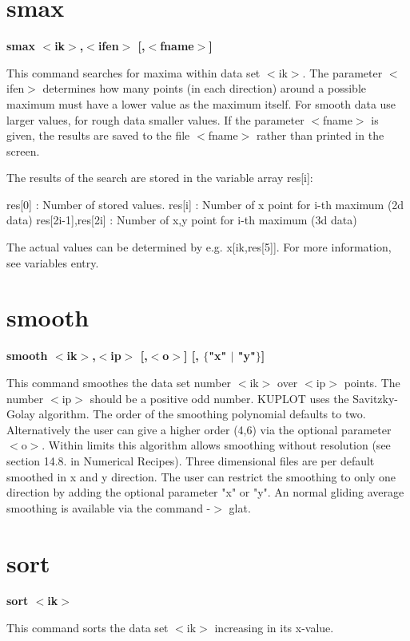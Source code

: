 \section{smax}
{\bf smax $ <$ik$> $,$ <$ifen$> $ [,$ <$fname$> $] \par }
\par
\vspace{3pt}
This command searches for maxima within data set $ <$ik$> $. 
The parameter $ <$ifen$> $ determines how many points (in each 
direction) around a possible maximum must have a lower value 
as the maximum itself. For smooth data use larger values, 
for rough data smaller values. If the parameter $ <$fname$> $ is given, 
the results are saved to the file $ <$fname$> $ rather than printed 
in the screen. 
\par
The results of the search are stored in the variable array res[i]: 
\par
\begin{MacVerbatim}
   res[0]              : Number of stored values.
   res[i]              : Number of x point for i-th maximum (2d data)
   res[2i-1],res[2i]   : Number of x,y point for i-th maximum (3d data)
\end{MacVerbatim}
The actual values can be determined by e.g. x[ik,res[5]]. For more 
information, see variables entry. 
\section{smooth}
{\bf smooth $ <$ik$> $,$ <$ip$> $ [,$ <$o$> $] [, $ \{$"x" $| $ "y"$\} $] \par }
\par
\vspace{3pt}
This command smoothes the data set number $ <$ik$> $ over $ <$ip$> $ points. 
The number $ <$ip$> $ should be a positive odd number. KUPLOT uses the 
Savitzky-Golay algorithm. The order of the smoothing polynomial defaults 
to two. Alternatively the user can give a higher order (4,6) via 
the optional parameter $ <$o$> $. Within limits this algorithm allows 
smoothing without resolution (see section 14.8. in Numerical Recipes). 
Three dimensional files are per default smoothed in x and y direction. 
The user can restrict the smoothing to only one direction by adding the 
optional parameter "x" or "y". An normal gliding average smoothing 
is available via the command -$> $ glat. 
\section{sort}
{\bf sort $ <$ik$> $ \par }
\par
\vspace{3pt}
This command sorts the data set $ <$ik$> $ increasing in its x-value. 
